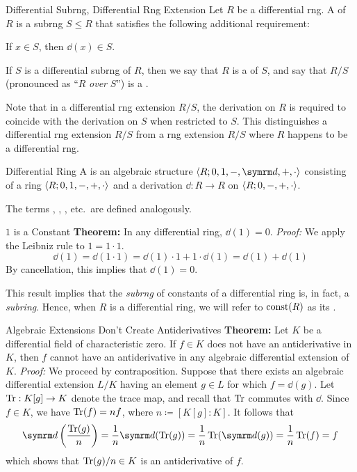\documentclass[12pt]{report}
\begin{document}
\begin{dfnbox}{Differential Subrng, Differential Rng Extension}
	Let $R$ be a differential rng. A  of $R$ is a subrng $S \le R$ that satisfies the following additional requirement:
	\begin{dfnitems}
		\item {} If $x \in S$, then $\dd(x) \in S$.
	\end{dfnitems}
	If $S$ is a differential subrng of $R$, then we say that $R$ is a  of $S$, and say that $R/S$ (pronounced as ``$R$ \textit{over} $S$'') is a .
\end{dfnbox}

Note that in a differential rng extension $R/S$, the derivation on $R$ is required to coincide with the derivation on $S$ when restricted to $S$. This distinguishes a differential rng extension $R/S$ from a rng extension $R/S$ where $R$ happens to be a differential rng.

\begin{dfnbox}{Differential Ring}
	A  is an algebraic structure $\alg{R; 0, 1, -, \dd, +, \cdot}$ consisting of a ring ${\langle {R; 0, 1, -, +, \cdot} \rangle}$ and a derivation $\dd: R \to R$ on ${\langle {R; 0, -, +, \cdot} \rangle}$.
\end{dfnbox}

The terms , , , etc.\ are defined analogously.

\begin{thmbox}{$1$ is a Constant}
	\textbf{Theorem:} In any differential ring, $\dd(1) = 0$.
\tcblower
	\textit{Proof:} We apply the Leibniz rule to $1 = 1 \cdot 1$.
	\[ \dd(1) = \dd(1 \cdot 1) = \dd(1) \cdot 1 + 1 \cdot \dd(1) = \dd(1) + \dd(1) \]
	By cancellation, this implies that $\dd(1) = 0$.
\end{thmbox}

This result implies that the \textit{subrng} of constants of a differential ring is, in fact, a \textit{subring}. Hence, when $R$ is a differential ring, we will refer to $\operatorname{const}(R)$ as its .

\begin{thmbox}{Algebraic Extensions Don't Create Antiderivatives}
	\textbf{Theorem:} Let $K$ be a differential field of characteristic zero. If $f \in K$ does not have an antiderivative in $K$, then $f$ cannot have an antiderivative in any algebraic differential extension of $K$.
\tcblower
	\textit{Proof:} We proceed by contraposition. Suppose that there exists an algebraic differential extension $L/K$ having an element $g \in L$ for which $f = \dd(g)$. Let $\operatorname{Tr}: K[g] \to K$ denote the trace map, and recall that $\operatorname{Tr}$ commutes with $\dd$. Since $f \in K$, we have $\operatorname{Tr}(f) = nf$, where $n \coloneq [K[g] : K]$. It follows that
	\[ \dd \left( \frac{\Tr(g)}{n} \right) = \frac{1}{n} \dd(\Tr(g)) = \frac{1}{n} \Tr(\dd(g)) = \frac{1}{n} \Tr(f) = f \]
	which shows that $\operatorname{Tr}(g)/n \in K$ is an antiderivative of $f$.
\end{thmbox}
\end{document}
